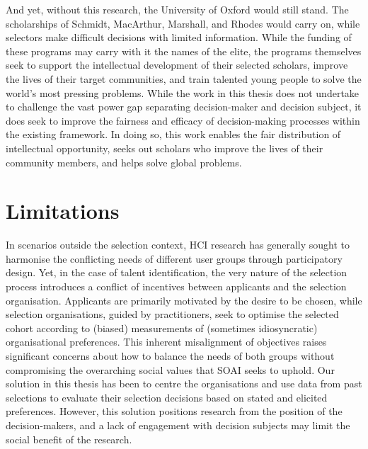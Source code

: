 And yet, without this research, the University of Oxford would still stand. The scholarships of Schmidt, MacArthur, Marshall, and Rhodes would carry on, while selectors make difficult decisions with limited information. While the funding of these programs may carry with it the names of the elite, the programs themselves seek to support the intellectual development of their selected scholars, improve the lives of their target communities, and train talented young people to solve the world's most pressing problems. While the work in this thesis does not undertake to challenge the vast power gap separating decision-maker and decision subject, it does seek to improve the fairness and efficacy of decision-making processes within the existing framework. In doing so, this work enables the fair distribution of intellectual opportunity, seeks out scholars who improve the lives of their community members, and helps solve global problems.

\section{Limitations}
In scenarios outside the selection context, HCI research has generally sought to harmonise the conflicting needs of different user groups through participatory design. Yet, in the case of talent identification, the very nature of the selection process introduces a conflict of incentives between applicants and the selection organisation. Applicants are primarily motivated by the desire to be chosen, while selection organisations, guided by practitioners, seek to optimise the selected cohort according to (biased) measurements of (sometimes idiosyncratic) organisational preferences. This inherent misalignment of objectives raises significant concerns about how to balance the needs of both groups without compromising the overarching social values that SOAI seeks to uphold. Our solution in this thesis has been to centre the organisations and use data from past selections to evaluate their selection decisions based on stated and elicited preferences. However, this solution positions research from the position of the decision-makers, and a lack of engagement with decision subjects may limit the social benefit of the research.

